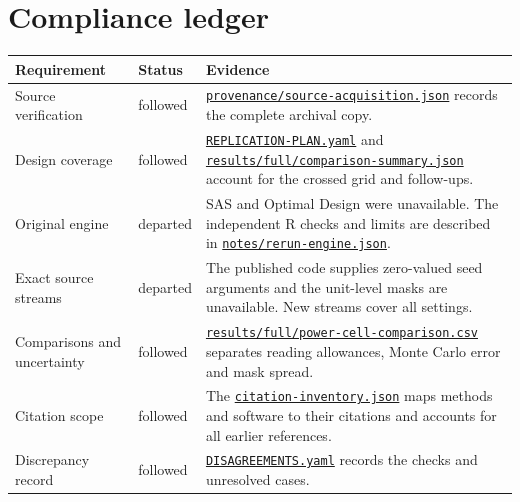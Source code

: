 \section{Compliance ledger}\label{sec:ledger}
\begin{tabular}{@{}L{.24\linewidth}L{.16\linewidth}L{.55\linewidth}@{}}
\toprule
Requirement & Status & Evidence \\
\midrule
Source verification & followed & \href{https://github.com/alectionary/vibe-math/blob/master/formalization/kupzyk-power-assumptions/provenance/source-acquisition.json}{\nolinkurl{provenance/source-acquisition.json}} records the complete archival copy. \\
Design coverage & followed & \href{https://github.com/alectionary/vibe-math/blob/master/formalization/kupzyk-power-assumptions/REPLICATION-PLAN.yaml}{\nolinkurl{REPLICATION-PLAN.yaml}} and \href{https://github.com/alectionary/vibe-math/blob/master/formalization/kupzyk-power-assumptions/results/full/comparison-summary.json}{\nolinkurl{results/full/comparison-summary.json}} account for the crossed grid and follow-ups. \\
Original engine & departed & SAS and Optimal Design were unavailable. The independent R checks and limits are described in \href{https://github.com/alectionary/vibe-math/blob/master/formalization/kupzyk-power-assumptions/notes/rerun-engine.json}{\nolinkurl{notes/rerun-engine.json}}. \\
Exact source streams & departed & The published code supplies zero-valued seed arguments and the unit-level masks are unavailable. New streams cover all settings. \\
Comparisons and uncertainty & followed & \href{https://github.com/alectionary/vibe-math/blob/master/formalization/kupzyk-power-assumptions/results/full/power-cell-comparison.csv}{\nolinkurl{results/full/power-cell-comparison.csv}} separates reading allowances, Monte Carlo error and mask spread. \\
Citation scope & followed & The \href{https://github.com/alectionary/vibe-math/blob/master/formalization/kupzyk-power-assumptions/citation-inventory.json}{\nolinkurl{citation-inventory.json}} maps methods and software to their citations and accounts for all earlier references. \\
Discrepancy record & followed & \href{https://github.com/alectionary/vibe-math/blob/master/formalization/kupzyk-power-assumptions/DISAGREEMENTS.yaml}{\nolinkurl{DISAGREEMENTS.yaml}} records the checks and unresolved cases. \\
\bottomrule
\end{tabular}

